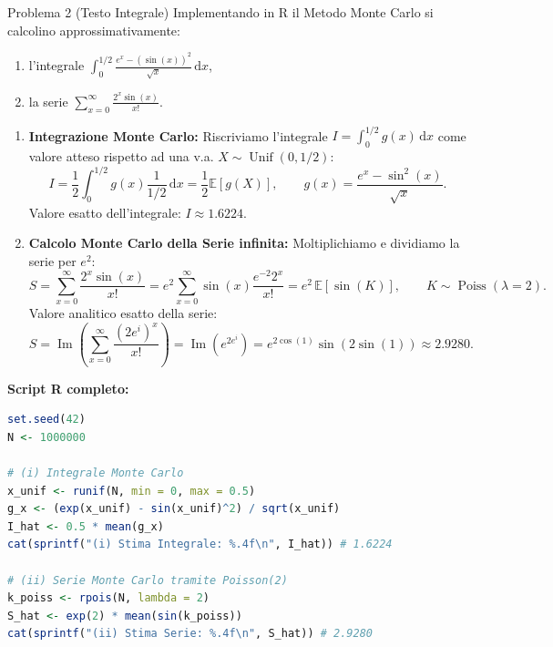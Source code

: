 \documentclass[11pt,a4paper]{article}
\newcommand{\EE}{\mathbb{E}}
\newcommand{\dx}{\mathrm{d}x}
\begin{document}
\begin{problemabox}{Problema 2 (Testo Integrale)}
Implementando in R il Metodo Monte Carlo si calcolino approssimativamente:
\begin{enumerate}[label=(\roman*)]
    \item l'integrale $\int_0^{1/2} \frac{e^x - (\sin(x))^2}{\sqrt{x}} \, \dx$,
    \item la serie $\sum_{x=0}^\infty \frac{2^x \sin(x)}{x!}$.
\end{enumerate}
\end{problemabox}

\begin{soluzionebox}
\begin{enumerate}[label=(\roman*)]
    \item \textbf{Integrazione Monte Carlo:}
    Riscriviamo l'integrale $I = \int_0^{1/2} g(x) \, \dx$ come valore atteso rispetto ad una v.a. $X \sim \operatorname{Unif}(0, 1/2)$:
    \[
    I = \frac{1}{2} \int_0^{1/2} g(x) \frac{1}{1/2} \, \dx = \frac{1}{2} \EE[g(X)], \qquad g(x) = \frac{e^x - \sin^2(x)}{\sqrt{x}}.
    \]
    Valore esatto dell'integrale: $I \approx \bm{1.6224}$.

    \item \textbf{Calcolo Monte Carlo della Serie infinita:}
    Moltiplichiamo e dividiamo la serie per $e^2$:
    \[
    S = \sum_{x=0}^\infty \frac{2^x \sin(x)}{x!} = e^2 \sum_{x=0}^\infty \sin(x) \frac{e^{-2} 2^x}{x!} = e^2 \, \EE[\sin(K)], \qquad K \sim \operatorname{Poiss}(\lambda=2).
    \]
    Valore analitico esatto della serie:
    \[
    S = \operatorname{Im}\left( \sum_{x=0}^\infty \frac{(2e^i)^x}{x!} \right) = \operatorname{Im}\left( e^{2 e^i} \right) = e^{2\cos(1)} \sin(2\sin(1)) \approx \bm{2.9280}.
    \]
\end{enumerate}

\textbf{Script R completo:}
\begin{lstlisting}[language=R]
set.seed(42)
N <- 1000000

# (i) Integrale Monte Carlo
x_unif <- runif(N, min = 0, max = 0.5)
g_x <- (exp(x_unif) - sin(x_unif)^2) / sqrt(x_unif)
I_hat <- 0.5 * mean(g_x)
cat(sprintf("(i) Stima Integrale: %.4f\n", I_hat)) # 1.6224

# (ii) Serie Monte Carlo tramite Poisson(2)
k_poiss <- rpois(N, lambda = 2)
S_hat <- exp(2) * mean(sin(k_poiss))
cat(sprintf("(ii) Stima Serie: %.4f\n", S_hat)) # 2.9280
\end{lstlisting}
\end{soluzionebox}
\end{document}
